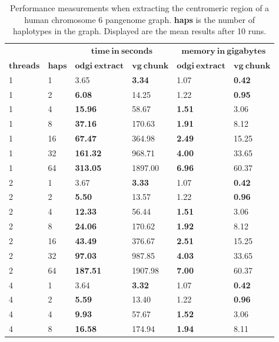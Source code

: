 \begin{table}[!ht]
	\centering
	\caption{\label{tab:extract} Performance measurements when extracting the centromeric region of a human chromosome 6 pangenome graph. \textbf{haps} is the number of haplotypes in the graph. Displayed are the mean results after 10 runs.}
	\begin{tabular}{@{}llllll@{}}
		& & \multicolumn{2}{c}{$\mathbf{time\ in\ seconds}$} & \multicolumn{2}{c}{$\mathbf{memory\ in\ gigabytes}$} \\ \cmidrule(lr){3-4} \cmidrule(lr){5-6}
		{$\mathbf{threads}$} & {$\mathbf{haps}$} & {$\mathbf{odgi\ extract}$} & {$\mathbf{vg\ chunk}$} & {$\mathbf{odgi\ extract}$} & {$\mathbf{vg\ chunk}$} \\ \hline
		1 & 1 & 3.65 & \textbf{3.34} & 1.07 & \textbf{0.42} \\ 
		1 & 2 & \textbf{6.08} & 14.25 & 1.22 & \textbf{0.95} \\ 
		1 & 4 & \textbf{15.96} & 58.67 & \textbf{1.51} & 3.06 \\ 
		1 & 8 & \textbf{37.16} & 170.63 & \textbf{1.91} & 8.12 \\ 
		1 & 16 & \textbf{67.47} & 364.98 & \textbf{2.49} & 15.25 \\ 
		1 & 32 & \textbf{161.32} & 968.71 & \textbf{4.00} & 33.65 \\ 
		1 & 64 & \textbf{313.05} & 1897.00 & \textbf{6.96} & 60.37 \\ \midrule
		2 & 1 & 3.67 & \textbf{3.33} & 1.07 & \textbf{0.42} \\ 
		2 & 2 & \textbf{5.50} & 13.57 & 1.22 & \textbf{0.96} \\ 
		2 & 4 & \textbf{12.33} & 56.44 & \textbf{1.51} & 3.06 \\ 
		2 & 8 & \textbf{24.06} & 170.62 & \textbf{1.92} & 8.12 \\ 
		2 & 16 & \textbf{43.49} & 376.67 & \textbf{2.51} & 15.25 \\ 
		2 & 32 & \textbf{97.03} & 987.85 & \textbf{4.03} & 33.65 \\ 
		2 & 64 & \textbf{187.51} & 1907.98 & \textbf{7.00} & 60.37 \\ \midrule
		4 & 1 & 3.64 & \textbf{3.32} & 1.07 & \textbf{0.42} \\ 
		4 & 2 & \textbf{5.59} & 13.40 & 1.22 & \textbf{0.96} \\ 
		4 & 4 & \textbf{9.93} & 57.67 & \textbf{1.52} & 3.06 \\ 
		4 & 8 & \textbf{16.58} & 174.94 & \textbf{1.94} & 8.11 \\ 

\end{tabular}
\end{table}
